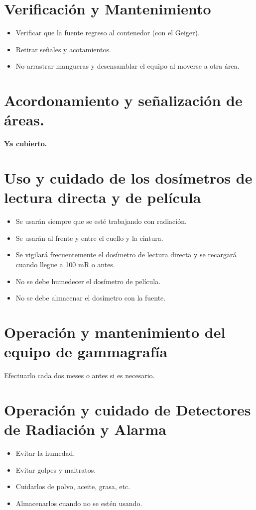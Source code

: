 \section*{Verificación y Mantenimiento}

\begin{itemize}
  \item Verificar que la fuente regreso al contenedor (con el Geiger).
  \item Retirar señales y acotamientos.
  \item No arrastrar mangueras y desensamblar el equipo al moverse a otra área.
\end{itemize}

\section*{Acordonamiento y señalización de áreas.}
\textbf{Ya cubierto.}

\section*{Uso y cuidado de los dosímetros de lectura directa y de película}
\begin{itemize}
  \item Se usarán siempre que se esté trabajando con radiación.
  \item Se usarán al frente y entre el cuello y la cintura.
  \item Se vigilará frecuentemente el dosímetro de lectura directa y se recargará cuando llegue a 100 mR o antes.
  \item No se debe humedecer el dosímetro de película.
  \item No se debe almacenar el dosímetro con la fuente.
\end{itemize}

\section*{Operación y mantenimiento del equipo de gammagrafía}
Efectuarlo cada dos meses o antes si es necesario.

\section*{Operación y cuidado de Detectores de Radiación y Alarma}
\begin{itemize}
  \item Evitar la humedad.
  \item Evitar golpes y maltratos.
  \item Cuidarlos de polvo, aceite, grasa, etc.
  \item Almacenarlos cuando no se estén usando.
\end{itemize}

